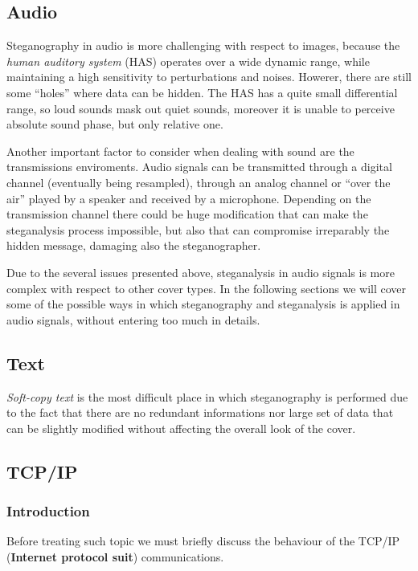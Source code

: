 \documentclass[../../main.tex]{subfiles}
\begin{document}
    \subsection{Audio}
    Steganography in audio is more challenging with respect to images, because
    the \emph{human auditory system} (HAS) operates over a wide dynamic range,
    while maintaining a high sensitivity to perturbations and noises.
    Howerer, there are still some ``holes'' where data can be hidden.
    The HAS has a quite small differential range, so loud sounds mask out quiet
    sounds, moreover it is unable to perceive absolute sound phase, but only
    relative one.

    Another important factor to consider when dealing with sound are the
    transmissions enviroments.
    Audio signals can be transmitted through a digital channel (eventually being
    resampled), through an analog channel or ``over the air'' played by a
    speaker and received by a microphone.
    Depending on the transmission channel there could be huge modification that
    can make the steganalysis process impossible, but also that can compromise
    irreparably the hidden message, damaging also the steganographer.

    Due to the several issues presented above, steganalysis in audio signals is
    more complex with respect to other cover types.
    In the following sections we will cover some of the possible ways in which
    steganography and steganalysis is applied in audio signals, without entering
    too much in details.

    

    \subsection{Text}
    \emph{Soft-copy text} is the most difficult place in which steganography is
    performed due to the fact that there are no redundant informations nor large
    set of data that can be slightly modified without affecting the overall look
    of the cover.

    \subsection{TCP/IP}
    \subsubsection{Introduction}
    Before treating such topic we must briefly discuss the behaviour of the
    TCP/IP (\textbf{Internet protocol suit}) communications.
    
\end{document}
